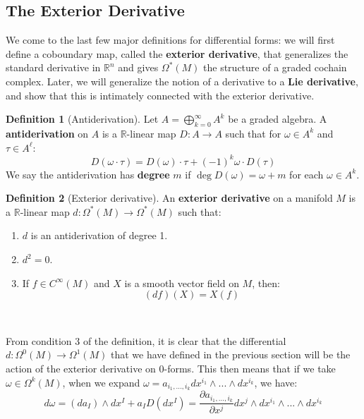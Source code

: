 \documentclass[11pt, oneside]{article}   	%
\theoremstyle{definition}
\newtheorem{definition}{Definition}[section]
\begin{document}
\subsection{The Exterior Derivative}

We come to the last few major definitions for differential forms: we will first define a coboundary map, called the \textbf{exterior 
derivative}, that generalizes the standard derivative in $\mathbb R^n$ and gives $\Omega^*(M)$ the structure of a 
graded cochain complex. Later, we will generalize the notion of a derivative to a \textbf{Lie derivative}, and show that this 
is intimately connected with the exterior derivative. 

\begin{definition}[Antiderivation]
	Let $A = \bigoplus_{k = 0}^\infty A^k$ be a graded algebra. A \textbf{antiderivation} on $A$ is a $\mathbb R$-linear map 
	$D : A\rightarrow A$ such that for $\omega\in A^k$ and $\tau\in A^\ell$:
	\begin{equation}
		D(\omega\cdot\tau) = D(\omega)\cdot\tau + (-1)^k\omega\cdot D(\tau)
	\end{equation}
	We say the antiderivation has \textbf{degree} $m$ if $\deg D(\omega) = \omega + m$ for each $\omega\in A^k$. 
\end{definition}

\begin{definition}[Exterior derivative]
	An \textbf{exterior derivative} on a manifold $M$ is a $\mathbb R$-linear map $d : \Omega^*(M)\rightarrow\Omega^*(M)$ 
	such that:
	\begin{enumerate}
		\item $d$ is an antiderivation of degree 1. 
		\item $d^2 = 0$. 
		\item If $f\in C^\infty(M)$ and $X$ is a smooth vector field on $M$, then:
		\begin{equation}
			(df)(X) = X(f)
		\end{equation}
	\end{enumerate}~
	\label{def:derivative}
\end{definition}

From condition 3 of the definition, it is clear that the differential $d : \Omega^0(M)\rightarrow\Omega^1(M)$ that we have 
defined in the previous section will be the action of the exterior derivative on $0$-forms. This then means that if we 
take $\omega\in\Omega^k(M)$, when we expand $\omega = a_{i_1, ..., i_k} dx^{i_1}\wedge ...\wedge dx^{i_k}$, we have:
\begin{equation}
	d\omega = (da_I)\wedge dx^I + a_I D(dx^I) = \frac{\partial a_{i_1, ..., i_k}}{\partial x^j}dx^j\wedge dx^{i_1}\wedge ... 
	\wedge dx^{i_k}
\end{equation}
\end{document}
